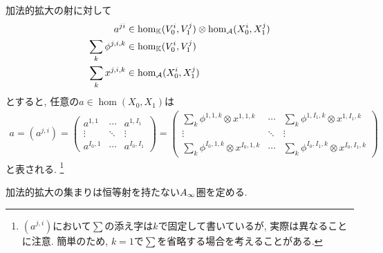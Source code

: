 \documentclass[uplatex, a4paper, 14Q, dvipdfmx]{jsarticle}
\begin{document}
\begin{notation}[加法的拡大の射の行列表示]
  加法的拡大の射に対して
  \begin{align*}
    a^{ji} &\in \hom_{\mathbb{K}}(V_0^i,V_1^j) \otimes \hom_{\mathcal{A}}(X_0^i,X_1^j) \\
    \sum_{k} \phi^{j,i,k} &\in \hom_{\mathbb{K}}(V_0^i,V_1^j) \\
    \sum_{k} x^{j,i,k} &\in \hom_{\mathcal{A}}(X_0^i,X_1^j)
  \end{align*}
  とすると, 任意の$a \in \hom (X_0,X_1)$は
  \begin{align*}
    a = (a^{j,i}) 
    = \begin{pmatrix}
      a^{1,1} & \cdots & a^{1,I_1} \\
      \vdots & \ddots & \vdots \\
      a^{I_0,1} & \cdots & a^{I_0,I_1}
    \end{pmatrix}
    = \begin{pmatrix}
      \sum_{k} \phi^{1,1,k} \otimes x^{1,1,k} & \cdots & \sum_{k} \phi^{1,I_1,k} \otimes x^{1,I_1,k} \\
      \vdots & \ddots & \vdots \\
      \sum_{k} \phi^{I_0,1,k} \otimes x^{I_0,1,k} & \cdots & \sum_{k} \phi^{I_0,I_1,k} \otimes x^{I_0,I_1,k}
    \end{pmatrix}
  \end{align*}
  と表される. 
  \footnote{
    $(a^{j,i})$において$\sum$の添え字は$k$で固定して書いているが, 実際は異なることに注意.
    簡単のため, $k=1$で$\sum$を省略する場合を考えることがある. 
  }
\end{notation}

加法的拡大の集まりは恒等射を持たない$A_{\infty}$圏を定める.
\end{document}
